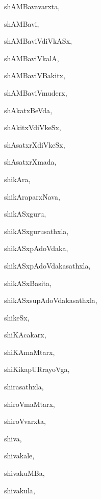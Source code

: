 \begin{multicols}{3}
{\noindent
{shAMBavavarxta}, \pageref{shAMBavavarxta}

\noindent
{shAMBavi}, \pageref{shAMBavi}

\noindent
{shAMBaviVdiVkASx}, \pageref{shAMBaviVdiVkASx}

\noindent
{shAMBaviVkalA}, \pageref{shAMBaviVkalA}

\noindent
{shAMBaviVBakitx}, \pageref{shAMBaviVBakitx}

\noindent
{shAMBaviVmuderx}, \pageref{shAMBaviVmuderx}

\noindent
{shAkatxBeVda}, \pageref{shAkatxBeVda}

\noindent
{shAkitxVdiVkeSx}, \pageref{shAkitxVdiVkeSx}

\noindent
{shAsatxrXdiVkeSx}, \pageref{shAsatxrXdiVkeSx}

\noindent
{shAsatxrXmada}, \pageref{shAsatxrXmada}

\noindent
{shikAra}, \pageref{shikAra}

\noindent
{shikAraparxNava}, \pageref{shikAraparxNava}

\noindent
{shikASxguru}, \pageref{shikASxguru}

\noindent
{shikASxgurusathxla}, \pageref{shikASxgurusathxla}

\noindent
{shikASxpAdoVdaka}, \pageref{shikASxpAdoVdaka}

\noindent
{shikASxpAdoVdakasathxla}, \pageref{shikASxpAdoVdakasathxla}

\noindent
{shikASxBasita}, \pageref{shikASxBasita}

\noindent
{shikASxsupAdoVdakasathxla}, \pageref{shikASxsupAdoVdakasathxla}

\noindent
{shikeSx}, \pageref{shikeSx}

\noindent
{shiKAcakarx}, \pageref{shiKAcakarx}

\noindent
{shiKAmaMtarx}, \pageref{shiKAmaMtarx}

\noindent
{shiKikapURrayoVga}, \pageref{shiKikapURrayoVga}

\noindent
{shirasathxla}, \pageref{shirasathxla}

\noindent
{shiroVmaMtarx}, \pageref{shiroVmaMtarx}

\noindent
{shiroVvarxta}, \pageref{shiroVvarxta}

\noindent
{shiva}, \pageref{shiva}

\noindent
{shivakale}, \pageref{shivakale}

\noindent
{shivakuMBa}, \pageref{shivakuMBa}

\noindent
{shivakula}, \pageref{shivakula}

}
\end{multicols}
